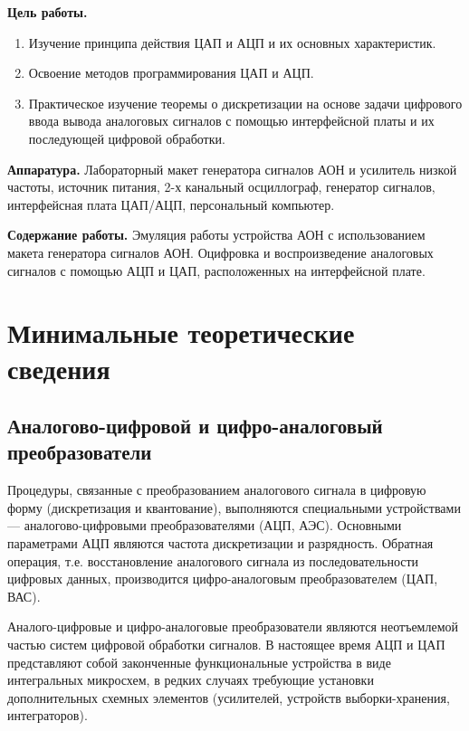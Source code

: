 \def \eng #1{\foreignlanguage{english}{#1}}

\textbf{Цель работы.}
%
\begin{enumerate}
	\item Изучение принципа действия ЦАП и АЦП и их основных характеристик.
    \item Освоение методов программирования ЦАП и АЦП.
    \item Практическое изучение теоремы о дискретизации на основе задачи цифрового ввода вывода аналоговых сигналов с помощью интерфейсной платы и их последующей цифровой обработки.
\end{enumerate}

\textbf{Аппаратура.} Лабораторный макет генератора сигналов АОН и усилитель низкой частоты, источник питания, 2-х канальный осциллограф, генератор сигналов, интерфейсная плата ЦАП/АЦП, персональный компьютер.

\textbf{Содержание работы.} Эмуляция работы устройства АОН с использованием макета генератора сигналов АОН. Оцифровка и воспроизведение аналоговых сигналов с помощью АЦП и ЦАП, расположенных на интерфейсной плате.

\section{Минимальные теоретические сведения}

\subsection{Аналогово-цифровой и цифро-аналоговый преобразователи}

Процедуры, связанные с преобразованием аналогового сигнала в цифровую форму (дискретизация и квантование), выполняются специальными устройствами --- аналогово-цифровыми преобразователями (АЦП, АЭС). Основными параметрами АЦП являются частота дискретизации и разрядность. Обратная операция, т.е. восстановление аналогового сигнала из последовательности цифровых данных, производится цифро-аналоговым преобразователем (ЦАП, ВАС).

Аналого-цифровые и цифро-аналоговые преобразователи являются неотъемлемой частью систем цифровой обработки сигналов. В настоящее время АЦП и ЦАП представляют собой законченные функциональные устройства в виде интегральных микросхем, в редких случаях требующие установки дополнительных схемных элементов (усилителей, устройств выборки-хранения, интеграторов).

